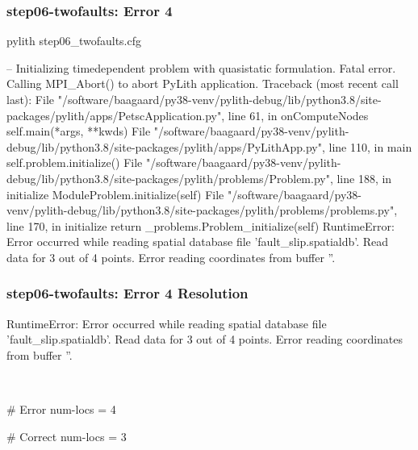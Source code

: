 \documentclass[aspectratio=169]{beamer}
\begin{document}
\begin{frame}[fragile]
  \frametitle{{\ttfamily step06-twofaults}: Error 4}

\begin{bashcode}
pylith step06_twofaults.cfg

 -- Initializing timedependent problem with quasistatic formulation.
Fatal error. Calling MPI_Abort() to abort PyLith application.
Traceback (most recent call last):
  File "/software/baagaard/py38-venv/pylith-debug/lib/python3.8/site-packages/pylith/apps/PetscApplication.py", line 61, in onComputeNodes
    self.main(*args, **kwds)
  File "/software/baagaard/py38-venv/pylith-debug/lib/python3.8/site-packages/pylith/apps/PyLithApp.py", line 110, in main
    self.problem.initialize()
  File "/software/baagaard/py38-venv/pylith-debug/lib/python3.8/site-packages/pylith/problems/Problem.py", line 188, in initialize
    ModuleProblem.initialize(self)
  File "/software/baagaard/py38-venv/pylith-debug/lib/python3.8/site-packages/pylith/problems/problems.py", line 170, in initialize
    return _problems.Problem_initialize(self)
RuntimeError: Error occurred while reading spatial database file 'fault_slip.spatialdb'.
Read data for 3 out of 4 points.
Error reading coordinates from buffer ''.
\end{bashcode}

\end{frame}


\begin{frame}[t,fragile]
  \frametitle{{\ttfamily step06-twofaults}: Error 4 Resolution}

  \tserror
  \begin{bashcode}
RuntimeError: Error occurred while reading spatial database file 'fault_slip.spatialdb'.
Read data for 3 out of 4 points.
Error reading coordinates from buffer ''.
  \end{bashcode}

  \pause\\[1pt]

  \begin{cfgcode}
    # Error
    num-locs = 4

    # Correct
    num-locs = 3
  \end{cfgcode}

\end{frame}
\end{document}
